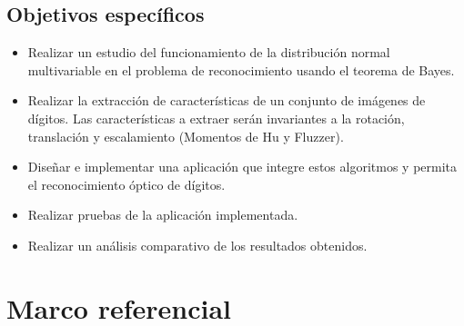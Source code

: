 \documentclass[a4paper, 11pt, oneside]{article}
\begin{document}
	\subsection{Objetivos específicos}
	\begin{itemize}
	\item Realizar un estudio del funcionamiento de la distribución normal multivariable en el problema de reconocimiento usando
	el teorema de Bayes.
	\item Realizar la extracción de características de un conjunto de imágenes de dígitos. Las características a extraer serán
	invariantes a la rotación, translación y escalamiento (Momentos de Hu y Fluzzer).
	\item Diseñar e implementar una aplicación que integre estos algoritmos y permita el reconocimiento óptico de dígitos.
	\item Realizar pruebas de la aplicación implementada.
	\item Realizar un análisis comparativo de los resultados obtenidos.
	\end{itemize}
	\clearpage
	
	\section{Marco referencial}
	
\end{document}
